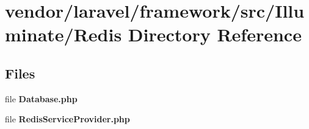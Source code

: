 \section{vendor/laravel/framework/src/\+Illuminate/\+Redis Directory Reference}
\label{dir_09e04a2adf67d08358fc01c67ed40b7f}
\subsection*{Files}
\begin{DoxyCompactItemize}
\item 
file {\bf Database.\+php}
\item 
file {\bf Redis\+Service\+Provider.\+php}
\end{DoxyCompactItemize}
